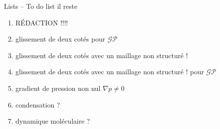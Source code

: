 \documentclass[aspect ratio=169,t]{beamer}
\numberwithin{equation}{section} %
\begin{document}
\begin{frame}{Lists -- To do list}
{il reste}
\begin{enumerate}
    \item \textcolor{green!50!black}{RÉ}DACTION !!!!
    \item glissement de deux cotés pour $\mathcal{GP}$
    \item glissement de deux cotés avec un maillage non structuré !
    \item glissement de deux cotés avec un maillage non structuré ! pour $\mathcal{GP}$
    \item gradient de pression non nul $\nabla p \neq 0$
    \item condensation ?
    \item dynamique moléculaire ?
\end{enumerate}
\end{frame}






\end{document}
